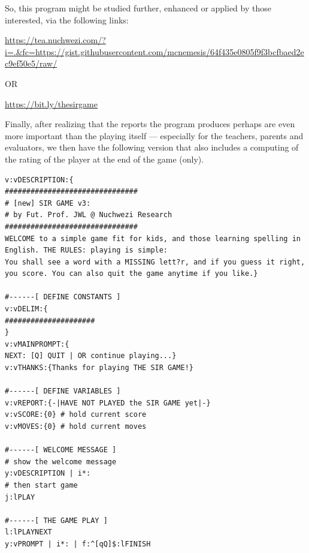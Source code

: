 \documentclass[a4paper, 18pt]{book} %
\begin{document}
{{{  
  
  
  So, this program might be studied further, enhanced or applied by those interested, via the following links:


 \vspace{1em}

 \url{https://tea.nuchwezi.com/?i=.&fc=https://gist.githubusercontent.com/mcnemesis/64f435e0805f9f3bcfbaed2ec9ef50e5/raw/}

\vspace{1em} 

OR

\vspace{1em} 

 \url{https://bit.ly/thesirgame}
  

\vspace{2em}

Finally, after realizing that the reports the program produces perhaps are even more important than the playing itself --- especially for the teachers, parents and evaluators, we then have the following version that also includes a computing of the rating of the player at the end of the game (only). 


  
  \vspace{2em}


{
 \Large
  \begin{tcolorbox}[teaterminalstyle, title=TEA Program:  SIR GAME v3, breakable]
  \begin{lstlisting}[language=TEA,breaklines=true,]
v:vDESCRIPTION:{
###############################
# [new] SIR GAME v3: 
# by Fut. Prof. JWL @ Nuchwezi Research
###############################
WELCOME to a simple game fit for kids, and those learning spelling in English. THE RULES: playing is simple: 
You shall see a word with a MISSING lett?r, and if you guess it right, you score. You can also quit the game anytime if you like.}

#------[ DEFINE CONSTANTS ]
v:vDELIM:{
#####################
}
v:vMAINPROMPT:{
NEXT: [Q] QUIT | OR continue playing...}
v:vTHANKS:{Thanks for playing THE SIR GAME!}

#------[ DEFINE VARIABLES ]
v:vREPORT:{-|HAVE NOT PLAYED the SIR GAME yet|-}
v:vSCORE:{0} # hold current score
v:vMOVES:{0} # hold current moves

#------[ WELCOME MESSAGE ]
# show the welcome message
y:vDESCRIPTION | i*:
# then start game
j:lPLAY

#------[ THE GAME PLAY ]
l:lPLAYNEXT
y:vPROMPT | i*: | f:^[qQ]$:lFINISH


\end{lstlisting}
\end{tcolorbox}}}}}
\end{document}

